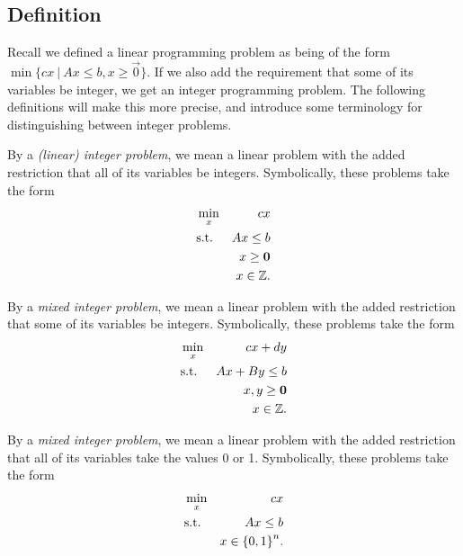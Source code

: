 \subsection{Definition} %

Recall we defined a linear programming problem as being of the form
$
    \min\{
        cx~|~Ax \leq b, x \geq \vec{0}
    \}
$.
If we also add the requirement that some of its variables be integer, we get an
integer programming problem. The following definitions will make this more
precise, and introduce some terminology for distinguishing between integer
problems.

\begin{definition}
    \label{def:integer-formulation}
    
    By a \emph{(linear) integer problem}, we mean a linear problem with the
    added restriction that all of its variables be integers. Symbolically, these
    problems take the form
    \begin{eqnarray*}
        &\min_x     & cx             \\
        &\text{s.t.}& Ax \leq b      \\
        &           &  x \geq {\mathbf{0}}\\
        &           &  x \in {\ensuremath{\mathbb{Z}}}.     \\
    \end{eqnarray*}
\end{definition}

\begin{definition}
    \label{def:mixed-integer-formulation}
    
    By a \emph{mixed integer problem}, we mean a linear problem with the added
    restriction that some of its variables be integers. Symbolically, these
    problems take the form
    \begin{eqnarray*}
        &\min_x     & cx + dy             \\
        &\text{s.t.}& Ax + By \leq b      \\
        &           &  x,   y \geq {\mathbf{0}}\\
        &           &  x \in {\ensuremath{\mathbb{Z}}}.          \\
    \end{eqnarray*}
\end{definition}

\begin{definition}
    \label{def:binary-integer-formulation}
    
    By a \emph{mixed integer problem}, we mean a linear problem with the added
    restriction that all of its variables take the values 0 or 1. Symbolically,
    these problems take the form
    \begin{eqnarray*}
        &\min_x     & cx               \\
        &\text{s.t.}& Ax \leq b        \\
        &           &  x \in {\ensuremath{\{ 0, 1 \}}}^n.\\
    \end{eqnarray*}
    
\end{definition}

